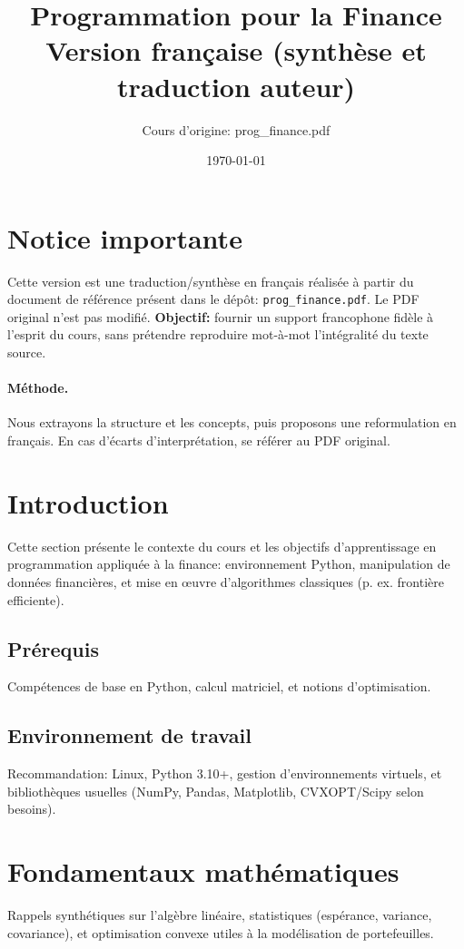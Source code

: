 \documentclass[11pt,a4paper]{article}
\title{Programmation pour la Finance\\\large Version française (synthèse et traduction auteur)}
\author{Cours d'origine: prog\_finance.pdf}
\date{\today}
\begin{document}
\maketitle
\tableofcontents
\newpage

\section*{Notice importante}
Cette version est une traduction/synthèse en français réalisée à partir du document de référence présent dans le dépôt: \texttt{prog\_finance.pdf}. Le PDF original n'est pas modifié.\newline
\textbf{Objectif:} fournir un support francophone fidèle à l'esprit du cours, sans prétendre reproduire mot-à-mot l'intégralité du texte source.

\paragraph{Méthode.} Nous extrayons la structure et les concepts, puis proposons une reformulation en français. En cas d'écarts d'interprétation, se référer au PDF original.

\section{Introduction}
Cette section présente le contexte du cours et les objectifs d'apprentissage en programmation appliquée à la finance: environnement Python, manipulation de données financières, et mise en œuvre d'algorithmes classiques (p. ex. frontière efficiente).

\subsection{Prérequis}
Compétences de base en Python, calcul matriciel, et notions d'optimisation.

\subsection{Environnement de travail}
Recommandation: Linux, Python 3.10+, gestion d'environnements virtuels, et bibliothèques usuelles (NumPy, Pandas, Matplotlib, CVXOPT/Scipy selon besoins).

\section{Fondamentaux mathématiques}
Rappels synthétiques sur l'algèbre linéaire, statistiques (espérance, variance, covariance), et optimisation convexe utiles à la modélisation de portefeuilles.
\end{document}
